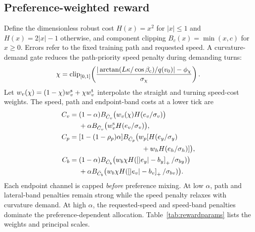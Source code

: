 \subsection{Preference-weighted reward}
Define the dimensionless robust cost $H(x)=x^2$ for $|x|\le1$ and $H(x)=2|x|-1$ otherwise, and component clipping $B_c(x)=\min(x,c)$ for $x\ge0$. Errors refer to the fixed training path and requested speed. A curvature-demand gate reduces the path-priority speed penalty during demanding turns:
\begin{equation}
 \chi=\operatorname{clip}_{[0,1]}\!\left(
 \frac{|\arctan(L\kappa/\cos\beta_{\rm c})/q(v_0)|-\phi_\chi}{\sigma_\chi}\right).
\label{eq:gate}
\end{equation}
Let $w_v(\chi)=(1-\chi)w_v^{\rm s}+\chi w_v^{\rm t}$ interpolate the straight and turning speed-cost weights. The speed, path and endpoint-band costs at a lower tick are
\begin{align}
C_v={}&(1-\alpha)B_{\bar C_v}\big(w_v(\chi)H(e_v/\sigma_v)\big)\notag\\
 &+\alpha B_{\bar C_v}\big(w_v^{\rm s}H(e_v/\sigma_v)\big),\label{eq:cv}\\
C_p={}&[1-(1-\rho_p)\alpha]B_{\bar C_p}\big(w_p[H(e_y/\sigma_y)\notag\\
 &\hspace{32mm}+w_hH(e_h/\sigma_h)]\big),\label{eq:cp}\\
C_b={}&(1-\alpha)B_{\bar C_b}\big(w_b\chi H(\pos{|e_y|-b_y}/\sigma_{by})\big)\notag\\
 &+\alpha B_{\bar C_b}\big(w_b\chi H(\pos{|e_v|-b_v}/\sigma_{bv})\big).
\label{eq:cb}
\end{align}
Each endpoint channel is capped \emph{before} preference mixing. At low $\alpha$, path and lateral-band penalties remain strong while the speed penalty relaxes with curvature demand. At high $\alpha$, the requested-speed and speed-band penalties dominate the preference-dependent allocation. Table~\ref{tab:rewardparams} lists the weights and principal scales.

